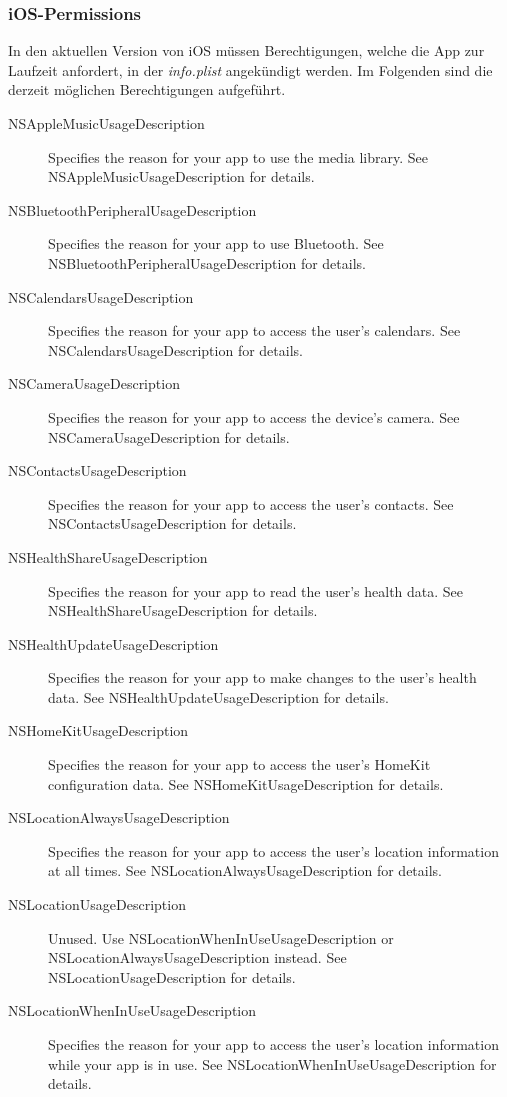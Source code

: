 \subsubsection{iOS-Permissions}
In den aktuellen Version von iOS müssen Berechtigungen, welche die App zur Laufzeit anfordert, in der \textit{info.plist} angekündigt werden. Im Folgenden sind die derzeit möglichen Berechtigungen aufgeführt.

\begin{description}
	\item[NSAppleMusicUsageDescription]  Specifies the reason for your app to use the media library. See NSAppleMusicUsageDescription for details.
	\item[NSBluetoothPeripheralUsageDescription] Specifies the reason for your app to use Bluetooth. See NSBluetoothPeripheralUsageDescription for details.
	\item[NSCalendarsUsageDescription] Specifies the reason for your app to access the user’s calendars. See NSCalendarsUsageDescription for details.
	\item[NSCameraUsageDescription] Specifies the reason for your app to access the device’s camera. See NSCameraUsageDescription for details.
	\item[NSContactsUsageDescription] Specifies the reason for your app to access the user’s contacts. See NSContactsUsageDescription for details.
	\item[NSHealthShareUsageDescription] Specifies the reason for your app to read the user’s health data. See NSHealthShareUsageDescription for details.
	\item[NSHealthUpdateUsageDescription] Specifies the reason for your app to make changes to the user’s health data. See NSHealthUpdateUsageDescription for details.
	\item[NSHomeKitUsageDescription] Specifies the reason for your app to access the user’s HomeKit configuration data. See NSHomeKitUsageDescription for details.
	\item[NSLocationAlwaysUsageDescription] Specifies the reason for your app to access the user’s location information at all times. See NSLocationAlwaysUsageDescription for details.
	\item[NSLocationUsageDescription] Unused. Use NSLocationWhenInUseUsageDescription or NSLocationAlwaysUsageDescription instead. See NSLocationUsageDescription for details.
	\item[NSLocationWhenInUseUsageDescription] Specifies the reason for your app to access the user’s location information while your app is in use. See NSLocationWhenInUseUsageDescription for details.

\end{description}
